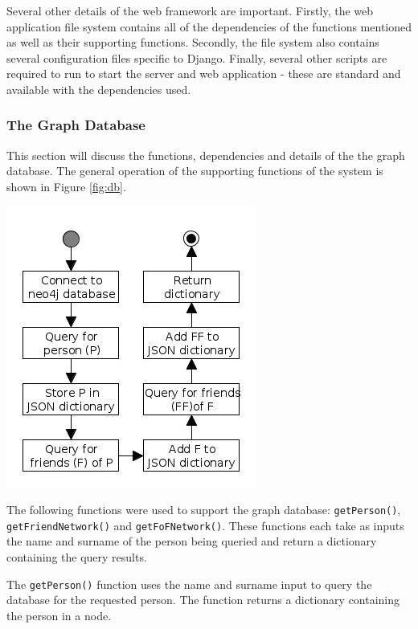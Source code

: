 \documentclass[12pt,onecolumn]{article}
\begin{document}
	Several other details of the web framework are important. Firstly, the web application file system contains all of the dependencies of the functions mentioned as well as their supporting functions. Secondly, the file system also contains several configuration files specific to Django. Finally, several other scripts are required to run to start the server and web application - these are standard and available with the dependencies used.
	
	\subsubsection{The Graph Database}
	This section will discuss the functions, dependencies and details of the the graph database. The general operation of the supporting functions of the system is shown in Figure \ref{fig:db}.
	
	\begin{center}
		\centering
		\includegraphics[scale=1]{neo4jdb}
		 \label{fig:db}
	\end{center}
	
	The following functions were used to support the graph database: \texttt{getPerson()}, \texttt{getFriendNetwork()} and \texttt{getFoFNetwork()}. These functions each take as inputs the name and surname of the person being queried and return a dictionary containing the query results. 
	
	The \texttt{getPerson()} function uses the name and surname input to query the database for the requested person. The function returns a dictionary containing the person in a node.
	
\end{document}
